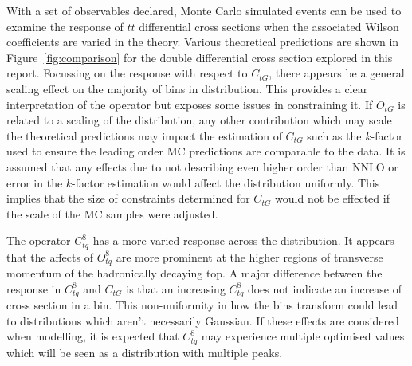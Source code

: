 \documentclass[a4paper,11pt]{article}
\begin{document}
With a set of observables declared, Monte Carlo simulated events can be used to examine the response of $t\bar{t}$ differential cross sections when the associated Wilson coefficients are varied in the theory.
Various theoretical predictions are shown in Figure~\ref{fig:comparison} for the double differential cross section explored in this report.
Focussing on the response with respect to $C_{tG}$, there appears be a general scaling effect on the majority of bins in distribution.
This provides a clear interpretation of the operator but exposes some issues in constraining it.
If $O_{tG}$ is related to a scaling of the distribution, any other contribution which may scale the theoretical predictions may impact the estimation of $C_{tG}$ such as the $k$-factor used to ensure the leading order MC predictions are comparable to the data.
It is assumed that any effects due to not describing even higher order than NNLO or error in the $k$-factor estimation would affect the distribution uniformly.
This implies that the size of constraints determined for $C_{tG}$ would not be effected if the scale of the MC samples were adjusted.

The operator $C_{tq}^{8}$ has a more varied response across the distribution.
It appears that the affects of $O_{tq}^{8}$ are more prominent at the higher regions of transverse momentum of the hadronically decaying top.
A major difference between the response in $C_{tq}^{8}$ and $C_{tG}$ is that an increasing $C_{tq}^{8}$ does not indicate an increase of cross section in a bin.
This non-uniformity in how the bins transform could lead to distributions which aren't necessarily Gaussian.
If these effects are considered when modelling, it is expected that $C_{tq}^{8}$ may experience multiple optimised values which will be seen as a distribution with multiple peaks.
\end{document}
